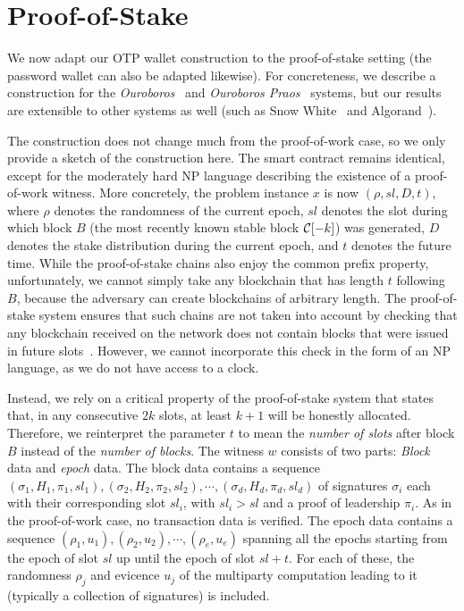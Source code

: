 \section{Proof-of-Stake}

We now adapt our OTP wallet construction to the proof-of-stake setting (the password wallet can also
be adapted likewise). For concreteness, we describe
a construction for the \emph{Ouroboros}~\cite{ouroboros} and \emph{Ouroboros Praos}~\cite{praos}
systems, but our results are extensible to other systems as well (such as Snow
White~\cite{DBLP:journals/iacr/BentovPS16a} and Algorand~\cite{algorand}).

The construction does not change much from the proof-of-work case, so we only provide a sketch
of the construction here. The smart contract remains identical, except
for the moderately hard \textsc{NP} language describing the existence of a proof-of-work witness.
More concretely, the problem instance $x$ is now $(\rho, sl, D, t)$, where $\rho$ denotes the randomness
of the current epoch, $sl$ denotes the
slot during which block $B$ (the most recently known stable block $\mathcal{C}[-k]$) was generated,
$D$ denotes the stake distribution during the current epoch, and $t$ denotes
the future time.
While the proof-of-stake chains also enjoy the common prefix property,
unfortunately, we cannot simply take any blockchain that has length $t$ following $B$,
because the adversary can create blockchains of arbitrary length. The proof-of-stake system
ensures that such chains are not taken into account by checking that any blockchain
received on the network does not contain blocks that were issued in future slots~\cite{ouroboros}.
However, we cannot incorporate this check in the form of an \textsc{NP} language, as
we do not have access to a clock.

Instead, we rely on a critical property of the proof-of-stake system that states that,
in any consecutive $2k$ slots, at least $k+1$ will be honestly allocated.
Therefore, we reinterpret the parameter $t$ to mean the \emph{number of slots} after
block $B$ instead of the \emph{number of blocks}. The witness $w$ consists
of two parts: \emph{Block} data and \emph{epoch} data.
The block data contains a sequence
$(\sigma_1, H_1, \pi_1, sl_1),\allowbreak (\sigma_2, H_2, \pi_2, sl_2),\allowbreak
 \cdots,\allowbreak (\sigma_d, H_d, \pi_d, sl_d)$
of signatures
$\sigma_i$ each with their corresponding slot $sl_i$, with $sl_i > sl$ and
a proof of leadership $\pi_i$. As in the proof-of-work case, no transaction data is verified.
The epoch data contains a sequence
$(\rho_1, u_1),\allowbreak (\rho_2, u_2),\allowbreak \cdots,\allowbreak (\rho_e, u_e)$
spanning all the epochs starting from the epoch of slot $sl$ up until the epoch
of slot $sl + t$. For each of these, the randomness $\rho_j$ and evicence $u_j$ of the multiparty
computation leading to it (typically a collection of signatures) is included.

